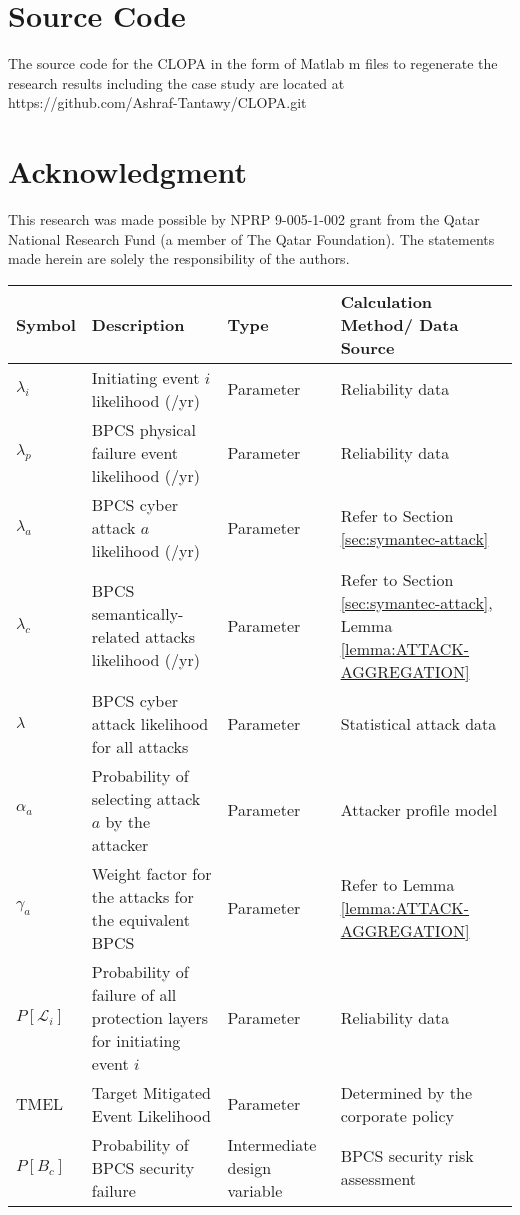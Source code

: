 \documentclass[journal]{IEEEtran}
\begin{document}
\section*{Source Code}
The source code for the CLOPA in the form of Matlab m files to regenerate the research results including the case study are located at https://github.com/Ashraf-Tantawy/CLOPA.git

\section*{Acknowledgment}
This research was made possible by NPRP 9-005-1-002 grant from the Qatar National Research Fund (a member of The Qatar Foundation). The statements made herein are solely the responsibility of the authors.

\begin{table*}[]
\centering
\begin{tabular}{p{1.5cm} p{6cm} p{3.5cm} p{4cm}}
	\hline\hline
	Symbol  &   Description &   Type & Calculation Method/ Data Source  \\
	\hline\hline
	$\lambda_i$   &   Initiating event $i$ likelihood (/yr)&   Parameter & Reliability data   \\
	$\lambda_p$ & BPCS physical failure event likelihood (/yr) & Parameter  & Reliability data\\
	$\lambda_a$ & BPCS cyber attack $a$ likelihood (/yr) & Parameter  & Refer to Section \ref{sec:symantec-attack}\\
	$\lambda_c$ & BPCS semantically-related attacks likelihood (/yr) & Parameter  & Refer to Section \ref{sec:symantec-attack}, Lemma \ref{lemma:ATTACK-AGGREGATION}\\
	$\lambda$ & BPCS cyber attack likelihood for all attacks & Parameter  & Statistical attack data \\
	$\alpha_a$ & Probability of selecting attack $a$ by the attacker & Parameter  & Attacker profile model \\
	$\gamma_a$ & Weight factor for the attacks for the equivalent BPCS & Parameter  & Refer to Lemma \ref{lemma:ATTACK-AGGREGATION} \\
	$P[\mathcal{L}_i]$ & Probability of failure of all protection layers for initiating event $i$ & Parameter & Reliability data \\
	TMEL & Target Mitigated Event Likelihood & Parameter & Determined by the corporate policy \\
	$P[B_c]$    &  Probability of BPCS security failure & Intermediate design variable & BPCS security risk assessment  \\

\end{tabular}
\end{table*}
\end{document}
